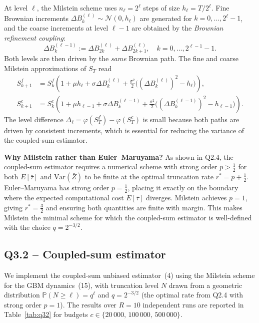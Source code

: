 \documentclass[11pt, a4paper]{article}
\begin{document}
At level $\ell$, the Milstein scheme uses $n_\ell=2^\ell$ steps of size $h_\ell=T/2^\ell$.
Fine Brownian increments $\Delta B_k^{(\ell)}\sim\mathcal{N}(0,h_\ell)$ are generated for
$k=0,\ldots,2^\ell-1$, and the coarse increments at level $\ell-1$ are obtained by
the \emph{Brownian refinement coupling}:
\[
  \Delta B_k^{(\ell-1)} := \Delta B_{2k}^{(\ell)} + \Delta B_{2k+1}^{(\ell)},
  \quad k=0,\ldots,2^{\ell-1}-1.
\]
Both levels are then driven by the \emph{same} Brownian path. The fine and coarse Milstein
approximations of $S_T$ read
\begin{align*}
  S_{k+1}^f &= S_k^f\!\left(1 + \mu h_\ell + \sigma\Delta B_k^{(\ell)}
              + \tfrac{\sigma^2}{2}\bigl((\Delta B_k^{(\ell)})^2 - h_\ell\bigr)\right),\\
  S_{k+1}^c &= S_k^c\!\left(1 + \mu h_{\ell-1} + \sigma\Delta B_k^{(\ell-1)}
              + \tfrac{\sigma^2}{2}\bigl((\Delta B_k^{(\ell-1)})^2 - h_{\ell-1}\bigr)\right).
\end{align*}
The level difference $\Delta_\ell = \varphi(S_T^f) - \varphi(S_T^c)$ is small because both
paths are driven by consistent increments, which is essential for reducing the variance of
the coupled-sum estimator.

\textbf{Why Milstein rather than Euler--Maruyama?}
As shown in Q2.4, the coupled-sum estimator requires a numerical scheme with strong order
$p>\frac12$ for both $E[\bar\tau]$ and $\text{Var}(\bar Z)$ to be finite at the optimal
truncation rate $r^*=p+\frac12$. Euler--Maruyama has strong order $p=\frac12$, placing it
exactly on the boundary where the expected computational cost $E[\bar\tau]$ diverges.
Milstein achieves $p=1$, giving $r^*=\frac32$ and ensuring both quantities are finite with
margin. This makes Milstein the minimal scheme for which the coupled-sum estimator is
well-defined with the choice $q=2^{-3/2}$.

\subsection*{Q3.2 -- Coupled-sum estimator}

We implement the coupled-sum unbiased estimator~(4) using the Milstein scheme for the GBM
dynamics~(15), with truncation level $N$ drawn from a geometric distribution
$\mathbb{P}(N\ge\ell)=q^\ell$ and $q=2^{-3/2}$ (the optimal rate from Q2.4 with strong order $p=1$).
The results over $R=10$ independent runs are reported in Table~\ref{tab:q32} for budgets
$c\in\{20\,000,\,100\,000,\,500\,000\}$.
\end{document}
